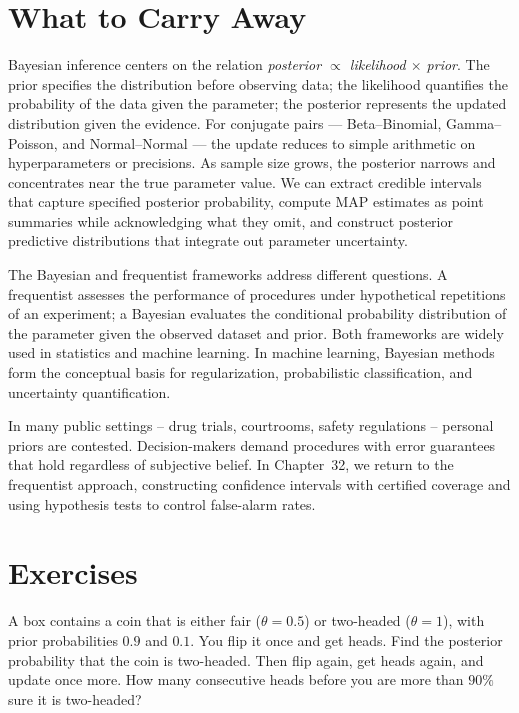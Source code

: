 \section{What to Carry Away}
\label{ch31:conclusion}

Bayesian inference centers on the relation \emph{posterior $\propto$ likelihood
$\times$ prior}. The prior specifies the distribution before observing data; the likelihood
quantifies the probability of the data given the parameter; the posterior represents the updated
distribution given the evidence. For conjugate pairs ---
Beta--Binomial, Gamma--Poisson, and Normal--Normal --- the update reduces to simple arithmetic on
hyperparameters or precisions. As sample size grows, the posterior narrows and concentrates near the
true parameter value. We can extract credible intervals that capture specified posterior probability,
compute MAP estimates as point summaries while acknowledging what they omit, and construct posterior
predictive distributions that integrate out parameter uncertainty.

The Bayesian and frequentist frameworks address different questions. A frequentist assesses
the performance of procedures under hypothetical repetitions of an experiment; a Bayesian evaluates
the conditional probability distribution of the parameter given the observed dataset and prior. Both
frameworks are widely used in statistics and machine learning. In machine learning, Bayesian methods
form the conceptual basis for regularization, probabilistic classification, and uncertainty quantification.

In many public settings -- drug trials, courtrooms, safety regulations --
personal priors are contested. Decision-makers demand procedures with error
guarantees that hold regardless of subjective belief. In Chapter~32, we return to
the frequentist approach, constructing confidence intervals with certified
coverage and using hypothesis tests to control false-alarm rates.

\section{Exercises}
\label{ch31:exercises}

\begin{exercise}
A box contains a coin that is either fair ($\theta = 0.5$) or two-headed ($\theta=1$), with
prior probabilities $0.9$ and $0.1$. You flip it once and get heads. Find the posterior
probability that the coin is two-headed. Then flip again, get heads again, and update once
more. How many consecutive heads before you are more than $90\%$ sure it is two-headed?
\end{exercise}


